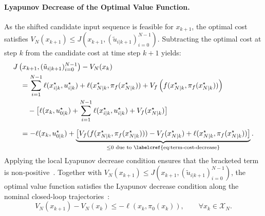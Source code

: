 \paragraph{Lyapunov Decrease of the Optimal Value Function.}
As the shifted candidate input sequence is feasible for $x_{k+1}$, the optimal cost satisfies 
$V_N(x_{k+1}) \leq J(x_{k+1}, (\tilde{u}_{i|k+1})_{i=0}^{N-1})$. 
Subtracting the optimal cost at step $k$ from the candidate cost at time step $k+1$ yields:
\begin{equation}
    \label{eq:cost-difference-derivation}
    \begin{aligned}
        &J \left( x_{k+1}, (\tilde{u}_{i|k+1})_{i=0}^{N-1} \right) - V_N(x_k) \\
        &\quad = \sum_{i=1}^{N-1} \ell(x_{i|k}^\star, u_{i|k}^\star) + \ell(x_{N|k}^\star, \pi_f(x_{N|k}^\star)) + V_f \left( f(x_{N|k}^\star, \pi_f(x_{N|k}^\star)) \right) \\
        &\qquad - \big[ \ell(x_k, u_{0|k}^\star) + \sum_{i=1}^{N-1} \ell(x_{i|k}^\star, u_{i|k}^\star) + V_f(x_{N|k}^\star) \big] \\[1.5ex]
        &\quad = -\ell(x_k, u_{0|k}^\star) + \underbrace{
            \big[ V_f(f(x_{N|k}^\star, \pi_f(x_{N|k}^\star))) - V_f(x_{N|k}^\star) + \ell(x_{N|k}^\star, \pi_f(x_{N|k}^\star)) \big]
        }_{\leq 0 \text{ due to \labelcref{eq:term-cost-decrease}}}.
    \end{aligned}
\end{equation}
Applying the local Lyapunov decrease condition  ensures that the bracketed term is 
non-positive~. 
Together with $V_N(x_{k+1}) \leq J(x_{k+1}, (\tilde{u}_{i|k+1})_{i=0}^{N-1})$, the optimal value function satisfies the 
Lyapunov decrease condition along the nominal closed-loop trajectories~:
\begin{equation}
    \label{eq:mpc-lyapunov-decrease}
    V_N(x_{k+1}) - V_N(x_k) \leq -\ell(x_k, \pi_0(x_k)), \qquad \forall x_k \in \mathcal{X}_N.
\end{equation}

